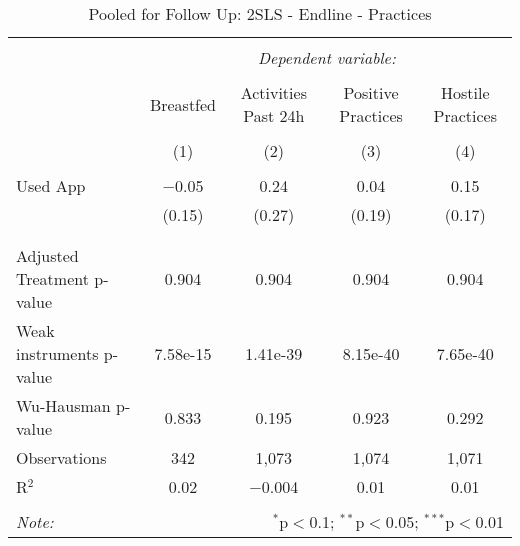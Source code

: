 
\begin{table}[!htbp] \centering 
  \caption{Pooled for Follow Up: 2SLS - Endline - Practices} 
  \label{tbl:Pooled for Follow Up: 2SLS - Endline - Practices} 
\begin{tabular}{@{\extracolsep{5pt}}lcccc} 
\\[-1.8ex]\hline 
\hline \\[-1.8ex] 
 & \multicolumn{4}{c}{\textit{Dependent variable:}} \\ 
\cline{2-5} 
\\[-1.8ex] & Breastfed & Activities Past 24h & Positive Practices & Hostile Practices \\ 
\\[-1.8ex] & (1) & (2) & (3) & (4)\\ 
\hline \\[-1.8ex] 
 Used App & $-$0.05 & 0.24 & 0.04 & 0.15 \\ 
  & (0.15) & (0.27) & (0.19) & (0.17) \\ 
  & & & & \\ 
\hline \\[-1.8ex] 
Adjusted Treatment p-value & 0.904 & 0.904 & 0.904 & 0.904 \\ 
Weak instruments p-value & 7.58e-15 & 1.41e-39 & 8.15e-40 & 7.65e-40 \\ 
Wu-Hausman p-value & 0.833 & 0.195 & 0.923 & 0.292 \\ 
Observations & 342 & 1,073 & 1,074 & 1,071 \\ 
R$^{2}$ & 0.02 & $-$0.004 & 0.01 & 0.01 \\ 
\hline 
\hline \\[-1.8ex] 
\textit{Note:}  & \multicolumn{4}{r}{$^{*}$p$<$0.1; $^{**}$p$<$0.05; $^{***}$p$<$0.01} \\ 
\end{tabular} 
\end{table} 
